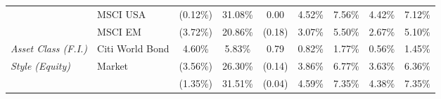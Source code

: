 \documentclass[12pt]{article}
\begin{document}
\begin{table}[H]
{\begin{tabular}{@{}llccccccc@{}}
                              & MSCI USA          & (0.12\%)                                                         & 31.08\%                                                              & 0.00                                                   & 4.52\%                                                        & 7.56\%                                                       & 4.42\%                                                        & 7.12\%                                                      \\
                              & MSCI EM           & (3.72\%)                                                         & 20.86\%                                                              & (0.18)                                                 & 3.07\%                                                        & 5.50\%                                                       & 2.67\%                                                        & 5.10\%                                                      \\ \midrule
\textit{Asset Class (F.I.)}   & Citi World Bond   & 4.60\%                                                           & 5.83\%                                                               & 0.79                                                   & 0.82\%                                                        & 1.77\%                                                       & 0.56\%                                                        & 1.45\%                                                      \\ \midrule
\textit{Style (Equity)}       & Market            & (3.56\%)                                                         & 26.30\%                                                              & (0.14)                                                 & 3.86\%                                                        & 6.77\%                                                       & 3.63\%                                                        & 6.36\%                                                      \\
\textit{}                     &                   & {\color[HTML]{303498} (1.35\%)}                                  & {\color[HTML]{303498} 31.51\%}                                       & {\color[HTML]{303498} (0.04)}                          & {\color[HTML]{303498} 4.59\%}                                 & {\color[HTML]{303498} 7.35\%}                                & {\color[HTML]{303498} 4.38\%}                                 & {\color[HTML]{303498} 7.35\%}                               \\

\end{tabular}}
\end{table}
\end{document}
